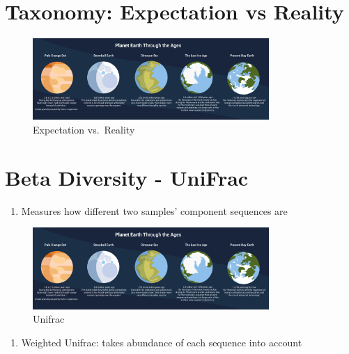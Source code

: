 \documentclass[
]{book}
\providecommand{\tightlist}{%
  \setlength{\itemsep}{0pt}\setlength{\parskip}{0pt}}
\begin{document}
\hypertarget{taxonomy-expectation-vs-reality}{%
\section{Taxonomy: Expectation vs Reality}\label{taxonomy-expectation-vs-reality}}

\begin{figure}
\centering
\includegraphics[width=0.8\textwidth,height=\textheight]{./Figures/Planets.png}
\caption{Expectation vs.~Reality}
\end{figure}

\hypertarget{beta-diversity---unifrac}{%
\section{Beta Diversity - UniFrac}\label{beta-diversity---unifrac}}

\begin{enumerate}
\def\labelenumi{\arabic{enumi}.}
\tightlist
\item
  Measures how different two samples' component sequences are
\end{enumerate}

\begin{figure}
\centering
\includegraphics[width=0.8\textwidth,height=\textheight]{./Figures/Planets.png}
\caption{Unifrac}
\end{figure}

\begin{enumerate}
\def\labelenumi{\arabic{enumi}.}
\setcounter{enumi}{1}
\tightlist
\item
  Weighted Unifrac: takes abundance of each sequence into account
\end{enumerate}
\end{document}
